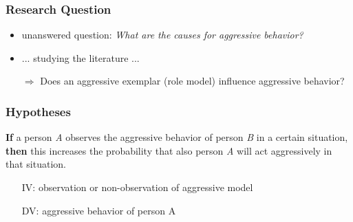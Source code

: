 \documentclass[]{beamer}
\begin{document}
\begin{frame}
\frametitle{Research Question}
\begin{itemize}
 \item unanswered question: \textit{What are the causes for aggressive
behavior?}
 \item ... studying the literature ...
 \item[$\Rightarrow$] Does an aggressive exemplar (role model) influence
aggressive behavior? 
\end{itemize}
\end{frame}

\begin{frame}
\frametitle{Hypotheses}
\textbf{If} a person \textit{A} observes the aggressive behavior
of person \textit{B} in a certain situation, \textbf{then} this increases the
probability that also person \textit{A} will act aggressively in that
situation.
\begin{itemize}
 \item[IV:] observation or non-observation of aggressive model
 \item[DV:] aggressive behavior of person A
\end{itemize}
\end{frame}


\end{document}
